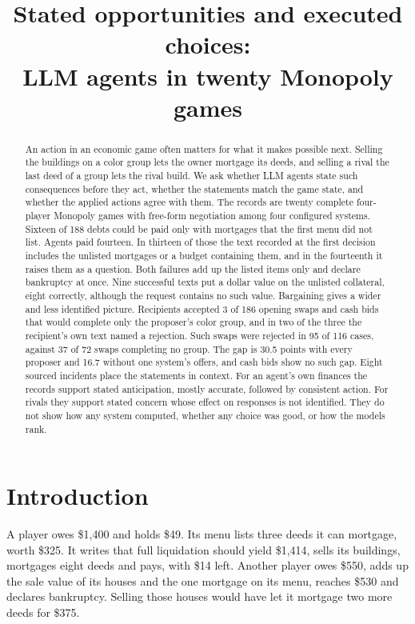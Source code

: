 \documentclass[11pt,letterpaper]{article}
\title{Stated opportunities and executed choices:\\LLM agents in twenty Monopoly games}
\author{}
\date{}
\begin{document}
\maketitle
\vspace{-3em}
\begin{abstract}
\noindent An action in an economic game often matters for what it makes possible next. Selling the buildings on a color group lets the owner mortgage its deeds, and selling a rival the last deed of a group lets the rival build. We ask whether LLM agents state such consequences before they act, whether the statements match the game state, and whether the applied actions agree with them. The records are twenty complete four-player Monopoly games with free-form negotiation among four configured systems. Sixteen of 188 debts could be paid only with mortgages that the first menu did not list. Agents paid fourteen. In thirteen of those the text recorded at the first decision includes the unlisted mortgages or a budget containing them, and in the fourteenth it raises them as a question. Both failures add up the listed items only and declare bankruptcy at once. Nine successful texts put a dollar value on the unlisted collateral, eight correctly, although the request contains no such value. Bargaining gives a wider and less identified picture. Recipients accepted 3 of 186 opening swaps and cash bids that would complete only the proposer's color group, and in two of the three the recipient's own text named a rejection. Such swaps were rejected in 95 of 116 cases, against 37 of 72 swaps completing no group. The gap is 30.5 points with every proposer and 16.7 without one system's offers, and cash bids show no such gap. Eight sourced incidents place the statements in context. For an agent's own finances the records support stated anticipation, mostly accurate, followed by consistent action. For rivals they support stated concern whose effect on responses is not identified. They do not show how any system computed, whether any choice was good, or how the models rank.
\end{abstract}

\section{Introduction}

A player owes \$1,400 and holds \$49. Its menu lists three deeds it can mortgage, worth \$325. It writes that full liquidation should yield \$1,414, sells its buildings, mortgages eight deeds and pays, with \$14 left. Another player owes \$550, adds up the sale value of its houses and the one mortgage on its menu, reaches \$530 and declares bankruptcy. Selling those houses would have let it mortgage two more deeds for \$375.
\end{document}
